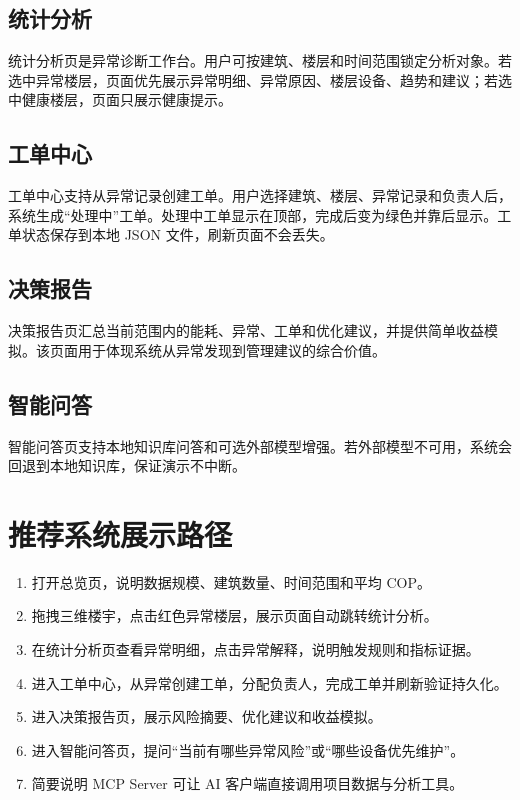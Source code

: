 \documentclass[12pt,a4paper]{ctexart}
\begin{document}
\subsection{统计分析}
统计分析页是异常诊断工作台。用户可按建筑、楼层和时间范围锁定分析对象。若选中异常楼层，页面优先展示异常明细、异常原因、楼层设备、趋势和建议；若选中健康楼层，页面只展示健康提示。

\subsection{工单中心}
工单中心支持从异常记录创建工单。用户选择建筑、楼层、异常记录和负责人后，系统生成“处理中”工单。处理中工单显示在顶部，完成后变为绿色并靠后显示。工单状态保存到本地 JSON 文件，刷新页面不会丢失。

\subsection{决策报告}
决策报告页汇总当前范围内的能耗、异常、工单和优化建议，并提供简单收益模拟。该页面用于体现系统从异常发现到管理建议的综合价值。

\subsection{智能问答}
智能问答页支持本地知识库问答和可选外部模型增强。若外部模型不可用，系统会回退到本地知识库，保证演示不中断。

\section{推荐系统展示路径}
\begin{enumerate}
    \item 打开总览页，说明数据规模、建筑数量、时间范围和平均 COP。
    \item 拖拽三维楼宇，点击红色异常楼层，展示页面自动跳转统计分析。
    \item 在统计分析页查看异常明细，点击异常解释，说明触发规则和指标证据。
    \item 进入工单中心，从异常创建工单，分配负责人，完成工单并刷新验证持久化。
    \item 进入决策报告页，展示风险摘要、优化建议和收益模拟。
    \item 进入智能问答页，提问“当前有哪些异常风险”或“哪些设备优先维护”。
    \item 简要说明 MCP Server 可让 AI 客户端直接调用项目数据与分析工具。
\end{enumerate}
\end{document}
